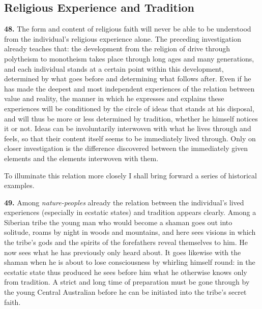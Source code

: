 \documentclass[12pt,a4paper]{book}
\newcommand{\opage}[1]{\marginnote{\footnotesize\textit{[#1]}}}
\begin{document}
\subsection{Religious Experience and Tradition}
\label{ssec:tradition}

\noindent\textbf{48.} The form and content of religious faith will never be able to be
understood from the individual's religious experience alone. The preceding investigation
already teaches that: the development from the religion of drive through polytheism to
monotheism takes place through long ages and many generations, and each individual stands
at a certain point within this development, determined by what goes before and determining
what follows after. Even if he has made the deepest and most independent experiences of the
relation between value and reality, the manner in which he expresses and explains these
experiences will be conditioned by the circle of ideas that stands at his disposal, and will
thus be more or less determined by tradition, whether he himself notices it or not. Ideas can
be involuntarily interwoven with what he lives through and feels, so that their content
itself seems to be immediately lived through. Only on closer investigation is the difference
discovered between the immediately given elements and the elements interwoven with them.

To illuminate this relation more closely I shall bring forward a series of historical examples.

\medskip

\noindent\textbf{49.} Among \emph{nature-peoples} already the relation between the
individual's lived experiences (especially in ecstatic states) and tradition appears clearly.
Among a Siberian tribe the young man who would become a shaman goes out into solitude, roams
by night in woods and mountains, and here sees visions in which the tribe's gods and the
spirits of the forefathers reveal themselves to him. He now sees what he has previously only
heard about. It goes likewise with the shaman 
\opage{110}when he is about to lose consciousness by
whirling himself round: in the ecstatic state thus produced he sees before him what he
otherwise knows only from tradition. A strict and long time of preparation must be gone
through by the young Central Australian before he can be initiated into the tribe's secret
faith.
\end{document}
